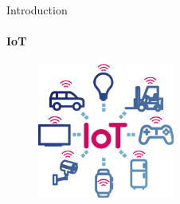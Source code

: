 \begin{frame}{Introduction}
\framesubtitle{IoT}
\begin{figure}
\centering
\includegraphics[width=0.4\textwidth]{presentation.tex/fig/iot.png}
\end{figure}
\end{frame}

